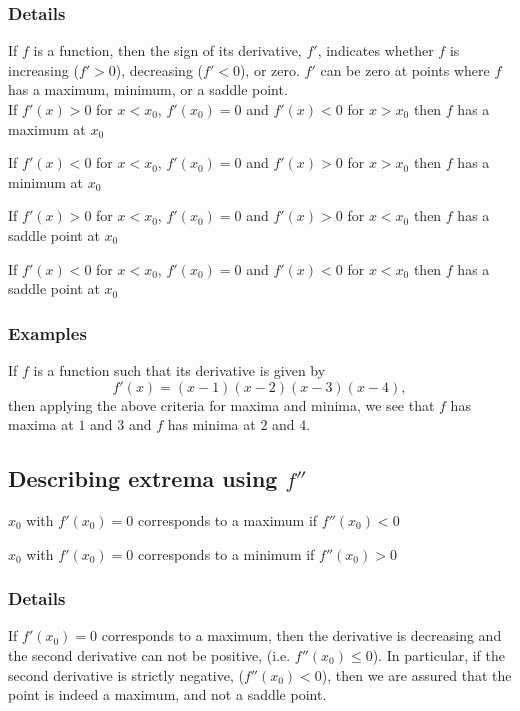\documentclass[12pt,a4paper]{article}
\theoremstyle{regla}
\theoremstyle{remark}
\theoremstyle{definition}
\theoremstyle{nonumberbreak}
\begin{document}
\subsubsection{Details}
If $f$ is a function, then the sign of its derivative, $f'$, indicates whether $f$ is increasing ($f'>0$), decreasing ($f'<0$), or zero. $f'$ can be zero at points where $f$ has a maximum, minimum, or a saddle point.\\

If $f'(x)>0$ for $x< x_0$, $f'(x_0)=0$ and $f'(x)<0$ for $x>x_0$ then $f$ has  a maximum at $x_0$ 

If $f'(x)<0$ for $x< x_0$, $f'(x_0)=0$ and $f'(x)>0$ for $x>x_0$ then  $f$ has   a minimum at $x_0$ 

If $f'(x)>0$ for $x< x_0$, $f'(x_0)=0$ and $f'(x)>0$ for $x< x_0$ then  $f$ has   a saddle point at $x_0$ 

If $f'(x)<0$ for $x< x_0$, $f'(x_0)=0$ and $f'(x)<0$ for $x< x_0$ then  $f$ has   a saddle point at $x_0$

\subsubsection{Examples}
\begin{xmpl}
If $f$ is a function such that its derivative is given by
$$
f'(x) = (x-1)(x-2)(x-3)(x-4),$$
then applying the above criteria for maxima and minima, we see that $f$ has maxima at $1$ and $3$ and $f$ has minima at $2$ and $4$.
\end{xmpl}

\subsection{Describing extrema using $f''$}
\begin{fbox}
\begin{minipage}{0.97\textwidth}
$x_0$ with $f'(x_0)=0$ corresponds to a maximum if  $f''(x_0)<0$

$x_0$ with $f'(x_0)=0$ corresponds to a minimum if  $f''(x_0)>0$


\end{minipage}
\end{fbox}
\subsubsection{Details}
If $f'(x_0)=0$ corresponds to a maximum, then the derivative is decreasing and the second derivative can not be positive, (i.e. $f''(x_0)\leq 0$).  In particular, if the second derivative is strictly negative, ($f''(x_0) <0$), then we are assured that the point is indeed a maximum, and not a saddle point.\\
\end{document}
